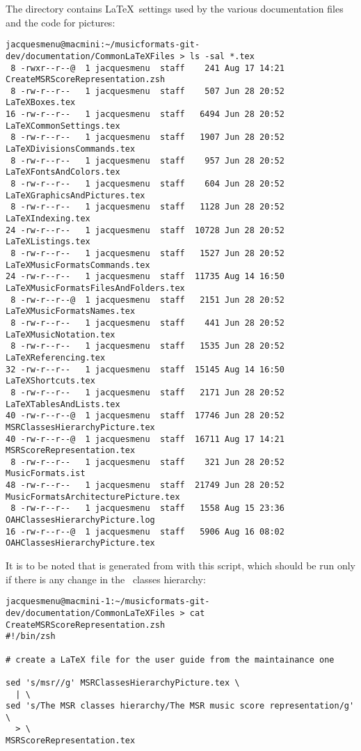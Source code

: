 The  directory contains \LaTeX\ settings used by the various documentation files and the code for pictures:
\begin{lstlisting}[language=Terminal]
jacquesmenu@macmini:~/musicformats-git-dev/documentation/CommonLaTeXFiles > ls -sal *.tex
 8 -rwxr--r--@  1 jacquesmenu  staff    241 Aug 17 14:21 CreateMSRScoreRepresentation.zsh
 8 -rw-r--r--   1 jacquesmenu  staff    507 Jun 28 20:52 LaTeXBoxes.tex
16 -rw-r--r--   1 jacquesmenu  staff   6494 Jun 28 20:52 LaTeXCommonSettings.tex
 8 -rw-r--r--   1 jacquesmenu  staff   1907 Jun 28 20:52 LaTeXDivisionsCommands.tex
 8 -rw-r--r--   1 jacquesmenu  staff    957 Jun 28 20:52 LaTeXFontsAndColors.tex
 8 -rw-r--r--   1 jacquesmenu  staff    604 Jun 28 20:52 LaTeXGraphicsAndPictures.tex
 8 -rw-r--r--   1 jacquesmenu  staff   1128 Jun 28 20:52 LaTeXIndexing.tex
24 -rw-r--r--   1 jacquesmenu  staff  10728 Jun 28 20:52 LaTeXListings.tex
 8 -rw-r--r--   1 jacquesmenu  staff   1527 Jun 28 20:52 LaTeXMusicFormatsCommands.tex
24 -rw-r--r--   1 jacquesmenu  staff  11735 Aug 14 16:50 LaTeXMusicFormatsFilesAndFolders.tex
 8 -rw-r--r--@  1 jacquesmenu  staff   2151 Jun 28 20:52 LaTeXMusicFormatsNames.tex
 8 -rw-r--r--   1 jacquesmenu  staff    441 Jun 28 20:52 LaTeXMusicNotation.tex
 8 -rw-r--r--   1 jacquesmenu  staff   1535 Jun 28 20:52 LaTeXReferencing.tex
32 -rw-r--r--   1 jacquesmenu  staff  15145 Aug 14 16:50 LaTeXShortcuts.tex
 8 -rw-r--r--   1 jacquesmenu  staff   2171 Jun 28 20:52 LaTeXTablesAndLists.tex
40 -rw-r--r--@  1 jacquesmenu  staff  17746 Jun 28 20:52 MSRClassesHierarchyPicture.tex
40 -rw-r--r--@  1 jacquesmenu  staff  16711 Aug 17 14:21 MSRScoreRepresentation.tex
 8 -rw-r--r--   1 jacquesmenu  staff    321 Jun 28 20:52 MusicFormats.ist
48 -rw-r--r--   1 jacquesmenu  staff  21749 Jun 28 20:52 MusicFormatsArchitecturePicture.tex
 8 -rw-r--r--   1 jacquesmenu  staff   1558 Aug 15 23:36 OAHClassesHierarchyPicture.log
16 -rw-r--r--@  1 jacquesmenu  staff   5906 Aug 16 08:02 OAHClassesHierarchyPicture.tex
\end{lstlisting}

It is to be noted that  is generated from  with this script, which should be run only if there is any change in the \msrRepr\ classes hierarchy:
\begin{lstlisting}[language=Terminal]
jacquesmenu@macmini-1:~/musicformats-git-dev/documentation/CommonLaTeXFiles > cat CreateMSRScoreRepresentation.zsh
#!/bin/zsh

# create a LaTeX file for the user guide from the maintainance one

sed 's/msr//g' MSRClassesHierarchyPicture.tex \
  | \
sed 's/The MSR classes hierarchy/The MSR music score representation/g' \
  > \
MSRScoreRepresentation.tex
\end{lstlisting}

